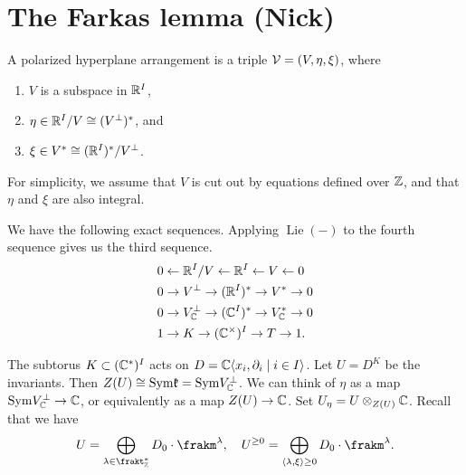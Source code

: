 \newpage

\section{The Farkas lemma (Nick)}

\begin{definition}
  A polarized hyperplane arrangement is a triple $\mathcal{V} = (V,\eta,\xi)$, where
  \begin{enumerate}
  \item $V$ is a subspace in $\mathbb{R}^I$,
  \item $\eta \in \mathbb{R}^I/V \cong (V^\perp)^*$, and
  \item $\xi\in V^* \cong (\mathbb{R}^I)^*/V^\perp$.
  \end{enumerate}
\end{definition}
For simplicity, we assume that $V$ is cut out by equations defined over $\mathbb{Z}$, and that $\eta$ and $\xi$ are also integral.

We have the following exact sequences.
Applying $\operatorname{Lie}(-)$ to the fourth sequence gives us the third sequence.
\begin{align*}
  0 &\leftarrow \mathbb{R}^I/V \leftarrow \mathbb{R}^I \leftarrow V \leftarrow 0\\
  0 &\to V^\perp \to (\mathbb{R}^I)^* \to V^*\to 0\\
  0 &\to V^\perp_{\mathbb{C}} \to (\mathbb{C}^I)^* \to V^*_{\mathbb{C}}\to 0\\
  1 &\to K \to (\mathbb{C}^\times)^I \to T \to 1.
\end{align*}

The subtorus $K\subset (\mathbb{C}^*)^I$ acts on $D = \mathbb{C}\langle x_i,\partial_i \mid i\in I \rangle$.
Let $U = D^K$ be the invariants.
Then $Z(U) \cong {\rm Sym } \mathfrak{k} = {\rm Sym } V^\perp_{\mathbb{C}}$.
We can think of $\eta$ as a map ${\rm Sym } V^\perp_{\mathbb{C}}\to \mathbb{C}$, or equivalently as a map $Z(U)\to \mathbb{C}$.
Set $U_\eta = U\otimes_{Z(U)}\mathbb{C}$.
Recall that we have
\[
  U = \bigoplus_{\lambda\in \frakt^*_\bbZ}D_0\cdot\frakm^\lambda,\quad U^{\geq 0} = \bigoplus_{\langle \lambda, \xi \rangle \geq 0}D_0\cdot \frakm^{\lambda}.
\]




 	





